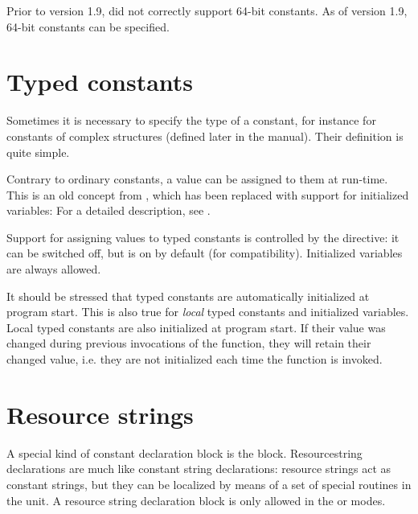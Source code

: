 Prior to version 1.9, \fpc did not correctly support 64-bit constants. As
of version 1.9, 64-bit constants can be specified.

\section{Typed constants}
\label{se:typedconstants}
Sometimes it is necessary to specify the type of a constant, for instance
for constants of complex structures (defined later in the manual).
Their definition is quite simple.



Contrary to ordinary constants, a value can be assigned to them at 
run-time.  This is an old concept from \tp, which has been 
replaced with  support for initialized variables: For a detailed 
description, see .

Support for assigning values to typed constants is controlled by the 
 directive: it can be switched off, but is on by default 
(for \tp compatibility). Initialized variables are always allowed.

\begin{remark}
It should be stressed that typed constants are automatically initialized at program start.
This is also true for \emph{local} typed constants and initialized variables. 
Local typed constants are also initialized at program start. If their value was 
changed during previous invocations of the function, they will retain their 
changed value, i.e. they are not initialized each time the function is invoked.
\end{remark}

\section{Resource strings}
\label{se:resourcestring}
A special kind of constant declaration block is the 
block. Resourcestring declarations are much like constant string
declarations: resource strings act as constant strings, but they 
can be localized by means of a set of special routines in the 
 unit. A resource string declaration block
is only allowed in the  or  modes.

